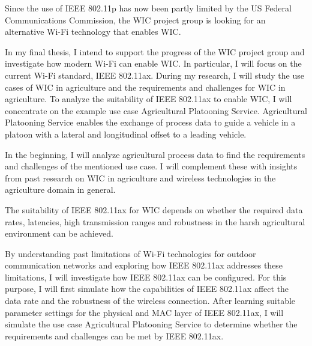 Since the use of IEEE 802.11p has now been partly limited by the  US Federal Communications Commission, the
WIC project group is looking for an alternative Wi-Fi technology that enables \ac{WIC}.

In my final thesis, I intend to support the progress of the \ac{WIC} project group and investigate how modern Wi-Fi can enable \ac{WIC}.
 In particular, I will focus on the current Wi-Fi standard, IEEE 802.11ax.
During my research, I will study the use cases of \ac{WIC} in agriculture and the requirements and challenges for \ac{WIC} in agriculture.
To analyze the suitability of IEEE 802.11ax to enable \ac{WIC}, I will concentrate on the example use case Agricultural Platooning Service.
Agricultural Platooning Service enables the exchange of process data
to guide a vehicle in a platoon with a lateral and longitudinal offset to a leading vehicle.

In the beginning, I will analyze agricultural process data to find the requirements and challenges of the mentioned use case.
I will complement these with insights from past research on \ac{WIC} in agriculture and wireless technologies
in the agriculture domain in general.

The suitability of IEEE 802.11ax for \ac{WIC} depends on whether the required data rates, latencies, high
transmission ranges and robustness in the harsh agricultural environment can be achieved.

By understanding past limitations of Wi-Fi technologies for outdoor communication networks
and exploring how IEEE 802.11ax addresses these limitations, I will investigate how IEEE 802.11ax can be configured.
For this purpose, I will first simulate how the capabilities of IEEE 802.11ax affect the data rate and the robustness of the wireless connection.
After learning suitable parameter settings for the physical and MAC layer of IEEE 802.11ax, I will simulate the use case
Agricultural Platooning Service to determine whether the requirements and challenges
can be met by IEEE 802.11ax.


